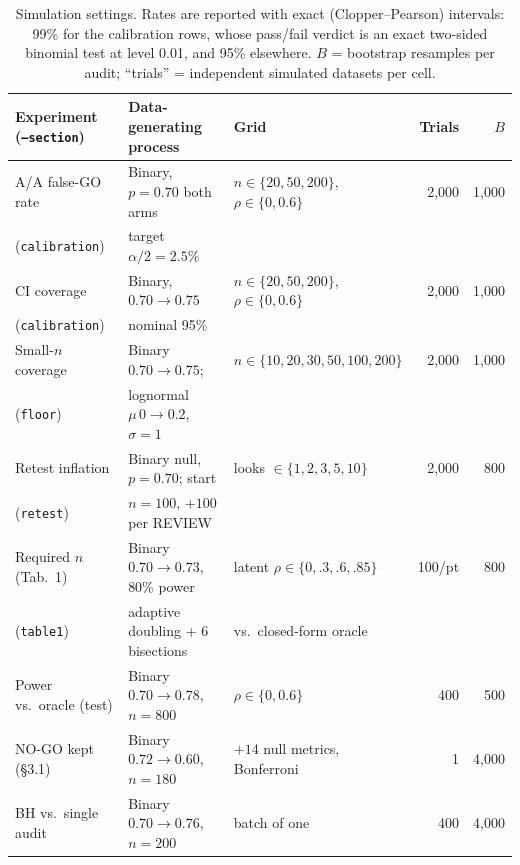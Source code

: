 \begin{table}[t]
\centering
\caption{Simulation settings. Rates are reported with exact (Clopper--Pearson)
intervals: 99\% for the calibration rows, whose pass/fail verdict is an exact two-sided
binomial test at level 0.01, and 95\% elsewhere.
$B$ = bootstrap resamples per audit; ``trials'' = independent simulated datasets per cell.}
\label{tab:settings}
\footnotesize
\setlength{\tabcolsep}{2.5pt}
\begin{tabular}{@{}l l l r r@{}}
\toprule
Experiment (\texttt{--section}) & Data-generating process & Grid & Trials & $B$ \\
\midrule
A/A false-GO rate        & Binary, $p{=}0.70$ both arms         & $n\in\{20,50,200\}$, $\rho\in\{0,0.6\}$ & 2{,}000 & 1{,}000 \\
(\texttt{calibration})   & target $\alpha/2 = 2.5\%$            &                                         &         &         \\
CI coverage              & Binary, $0.70\to0.75$                & $n\in\{20,50,200\}$, $\rho\in\{0,0.6\}$ & 2{,}000 & 1{,}000 \\
(\texttt{calibration})   & nominal 95\%                         &                                         &         &         \\
Small-$n$ coverage       & Binary $0.70\to0.75$;                & $n\in\{10,20,30,50,100,200\}$           & 2{,}000 & 1{,}000 \\
(\texttt{floor})         & lognormal $\mu\,0\to0.2$, $\sigma{=}1$ &                                       &         &         \\
Retest inflation         & Binary null, $p{=}0.70$; start         & looks $\in\{1,2,3,5,10\}$               & 2{,}000 & 800 \\
(\texttt{retest})        & $n{=}100$, $+100$ per REVIEW         &                                         &         &         \\
Required $n$ (Tab.~1)    & Binary $0.70\to0.73$, 80\% power     & latent $\rho\in\{0,.3,.6,.85\}$         & 100/pt  & 800 \\
(\texttt{table1})        & adaptive doubling + 6 bisections     & vs.\ closed-form oracle                 &         &         \\
Power vs.\ oracle (test) & Binary $0.70\to0.78$, $n{=}800$      & $\rho\in\{0,0.6\}$                      & 400     & 500 \\
NO-GO kept (\S3.1)       & Binary $0.72\to0.60$, $n{=}180$      & $+14$ null metrics, Bonferroni          & 1       & 4{,}000 \\
BH vs.\ single audit     & Binary $0.70\to0.76$, $n{=}200$      & batch of one                            & 400     & 4{,}000 \\
\bottomrule
\end{tabular}


\end{table}
